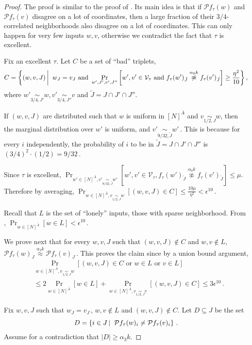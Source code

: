 \documentclass{toc}
\newcommand{\Prob}[2][]{\Pr_{{#1}}\left[#2\right]} %
\newcommand{\abs}[1]{\lvert#1\rvert} %
\newcommand\sett[2]{\left\{ #1 \left| \; \vphantom{#1 #2} \right. #2  \right\}} %
\newcommand\f{f} %
\newcommand\bh{\mathcal{P}\f_\tau} %
\newcommand\neql[1]{\stackrel{{#1}}{ \approx}} %
\newcommand\neqg[1]{\stackrel{{#1}}{ \not\approx}} %
\newcommand\cons{\mathcal{V}} %
\newcommand\cor[1]{\underset{\scriptscriptstyle#1}{\sim}} %
\newcommand\rest[1]{{\bar{#1}}}  %
\begin{document}
\begin{proof}
    The proof is similar to the proof of . Its main idea is that if $\bh(w)$ and $\bh(v)$ disagree on a lot of coordinates, then a large fraction of their 
%
%
$3/4$-correlated  %
neighborhoods also disagree on a lot of coordinates. This can only happen for very few inputs $w,v$, otherwise we contradict the fact that $\tau$ is excellent.

	Fix an excellent $\tau$.
	Let $C$ be a set of ``bad'' triplets,
	\[ C = \sett{(w,v,J)}{w_J=v_J\textrm{ and }\Prob[w',J',v',J'']{w',v'\in \cons_\tau\textrm{ and } \f_\tau(w')_{\tilde{J}}\neqg{\alpha_0 k} \f_\tau(v')_{\tilde{J}}} \geq \frac{\eta^2}{10}}, \]
where $w'\cor{3/4,J'}w,v'\cor{3/4,J''} v$ and $\tilde{J} = J\cap J'\cap J''$.
	
	If $(w,v, J)$ are distributed such that $w$ is uniform in $[N]^{\bar{A}}$ and $v\cor{1/2,J}{w}$, then the marginal distribution over $w'$ is uniform, and  $v'\cor{9/32,\tilde{J}}{w'}\,.$ This is because for every $i$ independently, the probability of $i$ to be in $\tilde{J} = J\cap J' \cap J''$ is
$(3/4)^2\cdot (1/2) = 9/32$\,.  %

	Since $\tau$ is excellent, $\Prob[{w'\in[N]^{\bar{A}},v'\cor{9/32,\tilde{J}}w'}]{w',v'\in \cons_\tau, \f_\tau(w')_{\tilde{J}}\neqg{\alpha_0 k} \f_\tau(v')_{\tilde{J}}} \leq \mu$. Therefore by averaging, $\Prob[{w\in[N]^{\bar
	A},v\cor{1/2,J}w}]{(w,v,J)\in C}\leq \frac{10\mu}{\eta^2}<\epsilon^{10}$\,. 
	
	Recall that $L$ is the set of ``lonely'' inputs, those with sparse neighborhood. From , $\Prob[{w\in [N]^{\rest{A}}}]{w\in L}<\epsilon^{10}$\,.
	
    We prove next that for every $w,v,J$ such that $(w,v,J)\notin C$ and $w,v\notin L$, $\bh(w)_J \neql{\alpha_3 k}\bh(v)_J$\,. This proves the claim since by a union bound argument, 
%
%
\begin{align*}
& \Prob[{w\in[N]^{\bar{A}},v\cor{1/2,J}w}]{(w,v,J)\in C \textrm{ or } w\in L \textrm{ or } v\in L} \\
&\leq 2\Pr_{w\in[N]^{\rest{A}}}[w\in L]+ \Prob[{w\in[N]^{\bar A},v\cor{1/2,J}v}]{(w,v,J)\in C} \leq 3\epsilon^{10}\,.
\end{align*}
	
	Fix $w,v,J$ such that $w_J = v_J$\,, $w,v\notin L$ and $(w,v,J)\notin C$. Let $D\subseteq J$ be the set
	\[ D = \sett{i\in J}{\bh(w)_i \neq \bh(v)_i}\,. \]
Assume %
for  %
a contradiction that $\abs{D}\geq \alpha_3 k$.
	

\end{proof}
\end{document}
